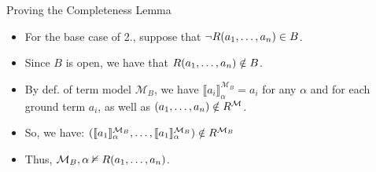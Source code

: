 \begin{frame}{Proving the Completeness Lemma}

  \begin{itemize}
	\itemsep=16pt

	\item For the base case of 2., suppose that $\neg R(a_1,\mathellipsis, a_n)\in B$.

	\item Since $B$ is open, we have that $R(a_1,\mathellipsis, a_n)\notin B$.

	\item By def. of term model $\mathcal{M}_B$, we have $\llbracket a_i\rrbracket^{\mathcal{M}_B}_\alpha=a_i$ for any $\alpha$ and for each ground term $a_i$, as well as $(a_1, \mathellipsis, a_n)\notin R^\mathcal{M}$.

	 \item So, we have: $(\llbracket a_1\rrbracket^{\mathcal{M}_B}_\alpha, \mathellipsis, \llbracket a_1\rrbracket^{\mathcal{M}_B}_\alpha)\notin R^{\mathcal{M}_B}$
	 
	 \item Thus, $\mathcal{M}_B,\alpha\nvDash R(a_1,\mathellipsis, a_n)$.

	\end{itemize}

\end{frame}

